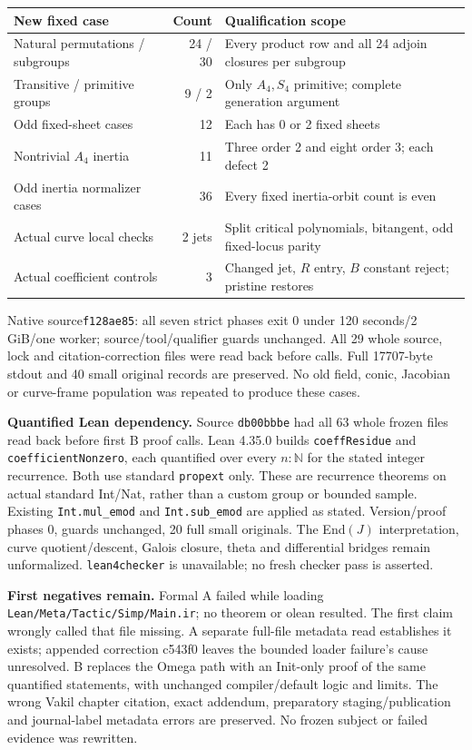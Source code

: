 \documentclass[10pt,a4paper]{article}
\begin{document}
\begin{center}
\begin{tabular}{>{\raggedright\arraybackslash}p{48mm}r>{\raggedright\arraybackslash}p{98mm}}
\toprule
New fixed case & Count & Qualification scope\\
\midrule
Natural permutations / subgroups &24 / 30& Every product row and all 24 adjoin closures per subgroup\\
Transitive / primitive groups &9 / 2& Only $A_4,S_4$ primitive; complete generation argument\\
Odd fixed-sheet cases &12& Each has 0 or 2 fixed sheets\\
Nontrivial $A_4$ inertia &11& Three order 2 and eight order 3; each defect 2\\
Odd inertia normalizer cases &36& Every fixed inertia-orbit count is even\\
Actual curve local checks &2 jets& Split critical polynomials, bitangent, odd fixed-locus parity\\
Actual coefficient controls &3& Changed jet, $R$ entry, $B$ constant reject; pristine restores\\
\bottomrule
\end{tabular}
\end{center}

Native source\texttt{f128ae85}: all seven strict phases exit 0 under
120 seconds/2 GiB/one worker; source/tool/qualifier guards unchanged.
All 29 whole source, lock and citation-correction files were read back
before calls. Full 17707-byte stdout and 40 small original records are
preserved. No old field, conic, Jacobian or curve-frame population was
repeated to produce these cases.

\textbf{Quantified Lean dependency.} Source \texttt{db00bbbe} had all 63
whole frozen files read back before first B proof calls. Lean 4.35.0
builds \texttt{coeffResidue} and \texttt{coefficientNonzero}, each
quantified over every $n:\mathbb N$ for the stated integer recurrence.
Both use standard \texttt{propext} only. These are recurrence theorems on
actual standard Int/Nat, rather than a custom group or bounded sample.
Existing \texttt{Int.mul\_emod} and \texttt{Int.sub\_emod} are applied
as stated. Version/proof phases 0, guards unchanged, 20 full small originals.
The End$(J)$ interpretation, curve quotient/descent, Galois closure,
theta and differential bridges remain unformalized.
\texttt{lean4checker} is unavailable; no fresh checker pass is asserted.

\textbf{First negatives remain.} Formal A failed while loading
\texttt{Lean/Meta/Tactic/Simp/Main.ir}; no theorem or olean resulted.
The first claim wrongly called that file missing. A separate full-file
metadata read establishes it exists; appended correction c543f0 leaves
the bounded loader failure's cause unresolved. B replaces the Omega
path with an Init-only proof of the same quantified statements, with
unchanged compiler/default logic and limits. The wrong Vakil chapter
citation, exact addendum, preparatory staging/publication and journal-label
metadata errors are preserved. No frozen subject or failed evidence
was rewritten.
\end{document}

